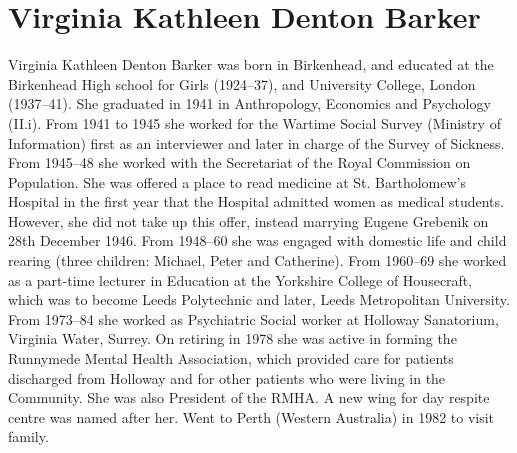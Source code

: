 \section{Virginia Kathleen Denton Barker}\label{Virginia_Kathleen_Denton_Barker}

Virginia Kathleen Denton Barker was born in Birkenhead, and educated at the Birkenhead High school for Girls (1924--37), and University College, London (1937--41). She graduated in 1941 in Anthropology, Economics and Psychology (II.i). From 1941 to 1945 she worked for the Wartime Social Survey (Ministry of Information) first as an interviewer and later in charge of the Survey of Sickness. From 1945--48 she worked with the Secretariat of the Royal Commission on Population. She was offered a place to read medicine at St. Bartholomew's Hospital in the first year that the Hospital admitted women as medical students. However, she did not take up this offer, instead marrying Eugene Grebenik on 28th December 1946. From 1948--60 she was engaged with domestic life and child rearing (three children: Michael, Peter and Catherine). From 1960--69 she worked as a part-time lecturer in Education at the Yorkshire College of Housecraft, which was to become Leeds Polytechnic and later, Leeds Metropolitan University. From 1973--84 she worked as Psychiatric Social worker at Holloway Sanatorium, Virginia Water, Surrey. On retiring in 1978 she was active in forming the Runnymede Mental Health Association, which provided care for patients discharged from Holloway and for other patients who were living in the Community. She was also President of the RMHA. A new wing for day respite centre was named after her. \cite{VirginiaDocs} Went to Perth (Western Australia) in 1982 to visit family.
